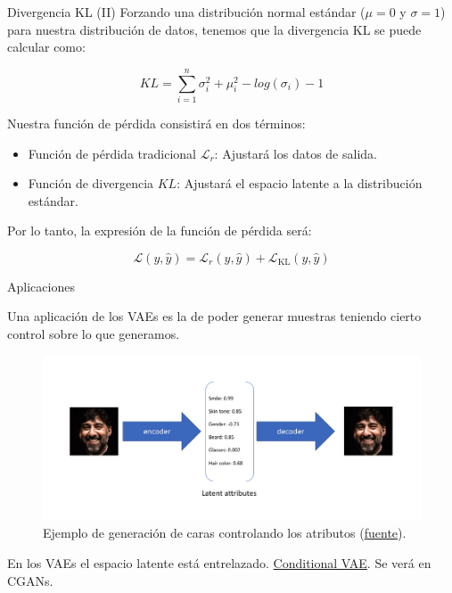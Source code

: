 \begin{frame}{Divergencia KL (II)}
Forzando una distribución normal estándar ($\mu = 0$ y $\sigma = 1$) para nuestra distribución de datos, tenemos que la divergencia KL se puede calcular como:

$$
KL = \sum_{i=1}^{n}\sigma_{i}^{2} + \mu_{i}^{2}-log(\sigma_i)-1
$$

Nuestra función de pérdida consistirá en dos términos:

\begin{itemize}
    \item Función de pérdida tradicional $\mathcal{L}_r$: Ajustará los datos de salida.
    \item Función de divergencia $KL$: Ajustará el espacio latente a la distribución estándar.
\end{itemize}

Por lo tanto, la expresión de la función de pérdida será:

$$
\mathcal{L}(y, \hat{y}) = \mathcal{L}_r(y, \hat{y}) + \mathcal{L}_{\text{KL}} (y, \hat{y})
$$

\end{frame}

\begin{frame}{Aplicaciones}

Una aplicación de los VAEs es la de poder generar muestras teniendo \alert{cierto} control sobre lo que generamos.

\begin{figure}
    \centering
    \includegraphics[width=.7\textwidth]{Slides/figures/02_Metodos_Generativos/vae-face-generator.png}
    \caption{Ejemplo de generación de caras controlando los atributos (\href{https://www.jeremyjordan.me/variational-autoencoders/}{fuente}).}
    \label{fig:enter-label}
\end{figure}

En los VAEs el espacio latente está \alert{entrelazado}. \href{https://github.com/nnormandin/Conditional_VAE/blob/master/Conditional_VAE.ipynb}{Conditional VAE}. Se verá en CGANs.
    
\end{frame}

